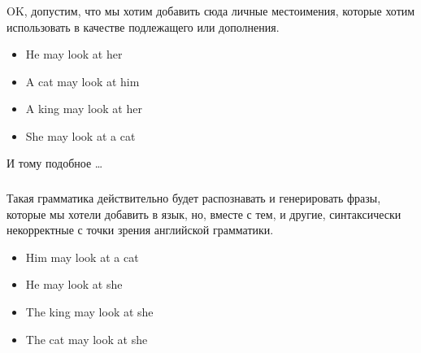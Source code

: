 \begin{frame}

	\frametitle{\insertsection}
	\framesubtitle{\insertsubsection}
	
	OK, допустим, что мы хотим добавить сюда личные местоимения, которые хотим использовать в качестве подлежащего или дополнения.
	
	\begin{itemize}
		\item He may look at her
		\item A cat may look at him
		\item A king may look at her
		\item She may look at a cat
	\end{itemize}

	И тому подобное \ldots
	
\end{frame}




\begin{frame}

	\frametitle{\insertsection}
	\framesubtitle{\insertsubsection}
	
	Такая грамматика действительно будет распознавать и генерировать фразы, которые мы хотели добавить в язык, но, вместе с тем, и
	другие, синтаксически некорректные с точки зрения английской грамматики.
	
	\begin{itemize}
		\item Him may look at a cat
		\item He may look at she
		\item The king may look at she
		\item The cat may look at she
	\end{itemize}
	
\end{frame}


